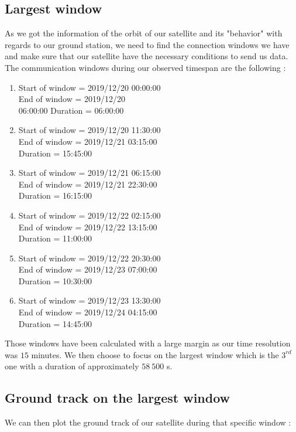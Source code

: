 \documentclass[a4paper,12pt,calibri,oneside,openany]{book}
\theoremstyle{break}
\begin{document}
\subsection{Largest window}
As we got the information of the orbit of our satellite and its "behavior" with regards to our ground station, we need to find the connection windows we have and make sure that our satellite have the necessary conditions to send us data. The communication windows during our observed timespan are the following :
\begin{enumerate}
	\item Start of window = 2019/12/20 00:00:00\\ End of window = 2019/12/20\\ 06:00:00 Duration = 06:00:00
	\item Start of window = 2019/12/20 11:30:00\\ End of window = 2019/12/21 03:15:00\\ Duration = 15:45:00
	\item Start of window = 2019/12/21 06:15:00\\ End of window = 2019/12/21 22:30:00\\ Duration = 16:15:00
	\item Start of window = 2019/12/22 02:15:00\\ End of window = 2019/12/22 13:15:00\\ Duration = 11:00:00
	\item Start of window = 2019/12/22 20:30:00\\ End of window = 2019/12/23 07:00:00\\ Duration = 10:30:00
	\item Start of window = 2019/12/23 13:30:00\\ End of window = 2019/12/24 04:15:00\\ Duration = 14:45:00
\end{enumerate}

Those windows have been calculated with a large margin as our time resolution was $15$ minutes. We then choose to focus on the largest window which is the $3^{rd}$ one with a duration of approximately $58\ 500$ s.
\newpage
\subsection{Ground track on the largest window}
 We can then plot the ground track of our satellite during that specific window :
\end{document}
